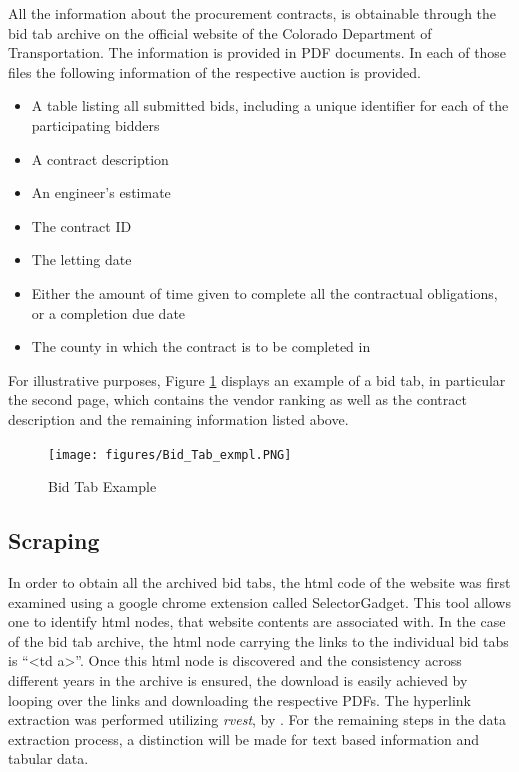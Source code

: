 \documentclass[a4paper,12pt, headsepline]{scrartcl}
\numberwithin{equation}{section}
\begin{document}
All the information about the procurement contracts, is obtainable through the bid tab archive on the official website of the Colorado Department of Transportation. The information is provided in PDF documents. In each of those files the following information of the respective auction is provided.

\begin{itemize}
	\item A table listing all submitted bids, including a unique identifier for each of the participating bidders
	\item A contract description
	\item An engineer's estimate
	\item The contract ID
	\item The letting date
	\item Either the amount of time given to complete all the contractual obligations, or a completion due date
	\item The county in which the contract is to be completed in 
\end{itemize}

For illustrative purposes, Figure \ref{fig:bidtab} displays an example of a bid tab, in particular the second page, which contains the vendor ranking as well as the contract description and the remaining information listed above.

\begin{figure}[H]
	\texttt{[image: figures/Bid\_Tab\_exmpl.PNG]}
	\caption{Bid Tab Example}\label{fig:bidtab}
\end{figure}

\subsection{Scraping}\label{subsec:scrap}
In order to obtain all the archived bid tabs, the html code of the website was first examined using a google chrome extension called SelectorGadget. This tool allows one to identify html nodes, that website contents are associated with. In the case of the bid tab archive, the html node carrying the links to the individual bid tabs is \enquote{<td a>}. Once this html node is discovered and the consistency across different years in the archive is ensured, the download is easily achieved by looping over the links and downloading the  respective PDFs. The hyperlink extraction was performed utilizing \textit{rvest}, by \citet{rvest}. For the remaining steps in the data extraction process, a distinction will be made for text based information and tabular data.
\end{document}
